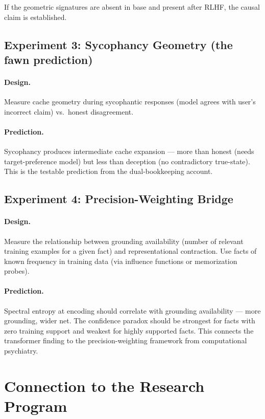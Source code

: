 \documentclass[11pt,letterpaper]{article}
\begin{document}
If the geometric signatures are absent in base and present after RLHF,
the causal claim is established.

\subsection{Experiment 3: Sycophancy Geometry (the fawn prediction)}

\paragraph{Design.} Measure cache geometry during sycophantic responses
(model agrees with user's incorrect claim) vs.\ honest disagreement.

\paragraph{Prediction.} Sycophancy produces intermediate cache expansion
--- more than honest (needs target-preference model) but less than
deception (no contradictory true-state). This is the testable prediction
from the dual-bookkeeping account.

\subsection{Experiment 4: Precision-Weighting Bridge}

\paragraph{Design.} Measure the relationship between grounding
availability (number of relevant training examples for a given fact) and
representational contraction. Use facts of known frequency in training
data (via influence functions or memorization probes).

\paragraph{Prediction.} Spectral entropy at encoding should correlate
with grounding availability --- more grounding, wider net. The
confidence paradox should be strongest for facts with zero training
support and weakest for highly supported facts. This connects the
transformer finding to the precision-weighting framework from
computational psychiatry.

\section{Connection to the Research Program}
\end{document}
